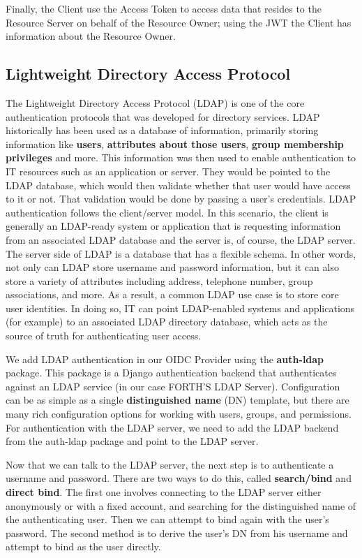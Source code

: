 Finally, the Client use the Access Token to access data  that resides to the Resource Server on behalf of the Resource Owner; using the JWT the Client has information about the Resource Owner.
	

\subsection{Lightweight Directory Access Protocol}

The Lightweight Directory Access Protocol (LDAP) is one of the core authentication protocols that was developed for directory services. LDAP historically has been used as a database of information, primarily storing information like \textbf{users}, \textbf{attributes about those users}, \textbf{group membership privileges} and more. This information was then used to enable authentication to IT resources such as an application or server. They would be pointed to the LDAP database, which would then validate whether that user would have access to it or not. That validation would be done by passing a user’s credentials. LDAP authentication follows the client/server model. In this scenario, the client is generally an LDAP-ready system or application that is requesting information from an associated LDAP database and the server is, of course, the LDAP server. The server side of LDAP is a database that has a flexible schema. In other words, not only can LDAP store username and password information, but it can also store a variety of attributes including address, telephone number, group associations, and more. As a result, a common LDAP use case is to store core user identities. In doing so, IT can point LDAP-enabled systems and applications (for example) to an associated LDAP directory database, which acts as the source of truth for authenticating user access.

We add LDAP authentication in our OIDC Provider using the \textbf{auth-ldap} \cite{ldapauth} package. This package is a Django authentication backend that authenticates against an LDAP service (in our case FORTH'S LDAP Server). Configuration can be as simple as a single \textbf{distinguished name} (DN) template, but there are many rich configuration options for working with users, groups, and permissions. For authentication with the LDAP server, we need to add the LDAP backend from the auth-ldap package and point to the LDAP server.

Now that we can talk to the LDAP server, the next step is to authenticate a username and password. There are two ways to do this, called \textbf{search/bind} and \textbf{direct bind}. The first one involves connecting to the LDAP server either anonymously or with a fixed account, and searching for the distinguished name of the authenticating user. Then we can attempt to bind again with the user’s password. The second method is to derive the user’s DN from his username and attempt to bind as the user directly.

